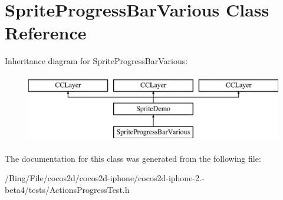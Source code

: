 \hypertarget{interface_sprite_progress_bar_various}{\section{Sprite\-Progress\-Bar\-Various Class Reference}
\label{interface_sprite_progress_bar_various}
}
Inheritance diagram for Sprite\-Progress\-Bar\-Various\-:\begin{figure}[H]
\begin{center}
\leavevmode
\includegraphics[height=3.000000cm]{interface_sprite_progress_bar_various}
\end{center}
\end{figure}


The documentation for this class was generated from the following file\-:\begin{DoxyCompactItemize}
\item 
/\-Bing/\-File/cocos2d/cocos2d-\/iphone/cocos2d-\/iphone-\/2.-\/beta4/tests/Actions\-Progress\-Test.\-h\end{DoxyCompactItemize}
